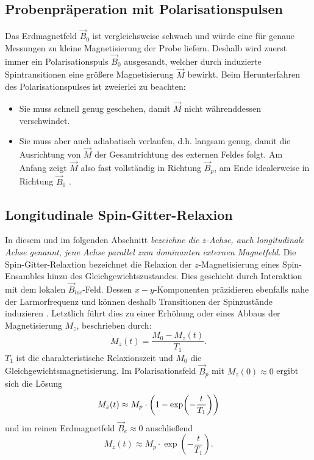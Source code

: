 \documentclass[../main.tex]{subfiles}
\begin{document}
\subsection{Probenpräperation mit Polarisationspulsen}

    Das Erdmagnetfeld $\vec B_0$ ist vergleichsweise schwach und würde eine für genaue Messungen zu kleine Magnetisierung der Probe liefern. Deshalb wird zuerst immer ein Polarisationspuls $\vec B_0$ ausgesandt, welcher durch induzierte Spintransitionen eine größere Magnetisierung $\vec M$ bewirkt. Beim Herunterfahren des Polarisationspulses ist zweierlei zu beachten:
    \begin{itemize}
        \item Sie muss schnell genug geschehen, damit $\vec M$ nicht währenddessen verschwindet.
        \item Sie muss aber auch adiabatisch verlaufen, d.h. langsam genug, damit die Ausrichtung von $\vec M$ der Gesamtrichtung des externen Feldes folgt. Am Anfang zeigt $\vec M$ also fast vollständig in Richtung $\vec B_p$, am Ende idealerweise in Richtung $\vec B_0$ \cite[p.19]{doc:EFNMRStudentManual}. %
    \end{itemize}

\subsection{Longitudinale Spin-Gitter-Relaxion}
    In diesem und im folgenden Abschnitt \textit{bezeichne die $z$-Achse, auch longitudinale Achse genannt, jene Achse parallel zum dominanten externen Magnetfeld}. Die Spin-Gitter-Relaxtion bezeichnet die Relaxion der $z$-Magnetisierung eines Spin-Ensambles hinzu des Gleichgewichtszustandes. Dies geschieht durch Interaktion mit dem lokalen $\vec{B}_{loc}$-Feld. Dessen $x-y$-Komponenten präzidieren ebenfalls nahe der Larmorfrequenz und können deshalb Transitionen der Spinzustände induzieren \cite[p.2]{PhysRev.110.65}. Letztlich führt dies zu einer Erhöhung oder eines Abbaus der Magnetisierung $M_z$, beschrieben durch:
    \[
        M_z(t) = \frac{M_0 - M_z(t)}{T_1}.
    \]
    $T_1$ ist die charakteristische Relaxionszeit und $M_0$ die Gleichgewichtsmagnetisierung. Im Polarisationsfeld $\vec{B}_p$ mit $M_z(0)\approx 0$ ergibt sich die Lösung \cite[p.35]{doc:EFNMRStudentManual}
    \[
        M_z(t) \approx M_p\cdot\left(1 - \exp(-\frac{t}{T_1})\right)
    \]
    und im reinen Erdmagnetfeld $\vec{B}_e\approx 0$ anschließend
     \[
        M_z(t) \approx M_p\cdot\exp(-\frac{t}{T_1}).
    \]
\end{document}

